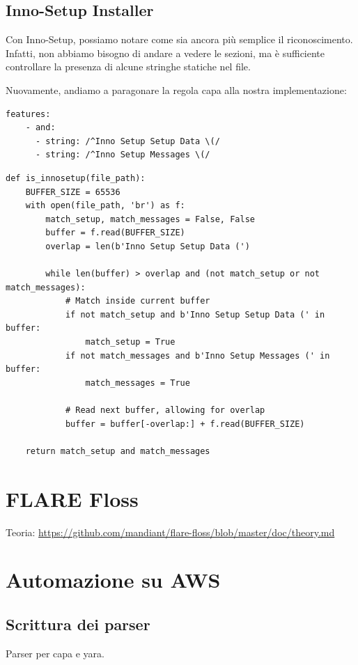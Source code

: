 \subsection{Inno-Setup Installer}
Con Inno-Setup, possiamo notare come sia ancora più semplice il riconoscimento. Infatti, non abbiamo bisogno di andare a vedere le sezioni, ma è sufficiente controllare la presenza di alcune stringhe statiche nel file.

Nuovamente, andiamo a paragonare la regola capa alla nostra implementazione:

\begin{verbatim}
features:
    - and:
      - string: /^Inno Setup Setup Data \(/
      - string: /^Inno Setup Messages \(/
\end{verbatim}

\begin{verbatim}
def is_innosetup(file_path):
    BUFFER_SIZE = 65536
    with open(file_path, 'br') as f:
        match_setup, match_messages = False, False
        buffer = f.read(BUFFER_SIZE)
        overlap = len(b'Inno Setup Setup Data (')

        while len(buffer) > overlap and (not match_setup or not match_messages):
            # Match inside current buffer
            if not match_setup and b'Inno Setup Setup Data (' in buffer:
                match_setup = True
            if not match_messages and b'Inno Setup Messages (' in buffer:
                match_messages = True
            
            # Read next buffer, allowing for overlap
            buffer = buffer[-overlap:] + f.read(BUFFER_SIZE)
    
    return match_setup and match_messages
\end{verbatim}

\section{FLARE Floss}
Teoria: \url{https://github.com/mandiant/flare-floss/blob/master/doc/theory.md}

\section{Automazione su AWS}
\subsection{Scrittura dei parser}
Parser per capa e yara.

